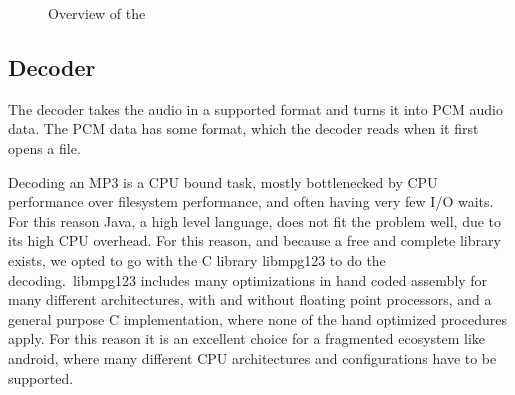 
\begin{figure}[ht]
	\centering
	\caption{Overview of the }\label{fig:mediaplayerParts}
\end{figure}

\subsection{Decoder}
\label{subsec:decoder}

The decoder takes the audio in a supported format and turns it into
\ac{PCM} audio data. The \ac{PCM} data has some format, which the
decoder reads when it first opens a file.

Decoding an MP3 is a CPU bound task, mostly bottlenecked by CPU
performance over filesystem performance, and often having very few I/O
waits. For this reason Java, a high level language, does not fit the
problem well, due to its high CPU overhead. For this reason, and because
a free and complete library exists, we opted to go with the C library
libmpg123 to do the decoding.\ libmpg123 includes many optimizations in
hand coded assembly for many different architectures, with and without
floating point processors, and a general purpose C implementation, where
none of the hand optimized procedures apply. For this reason it is an
excellent choice for a fragmented ecosystem like android, where many
different CPU architectures and configurations have to be supported.

